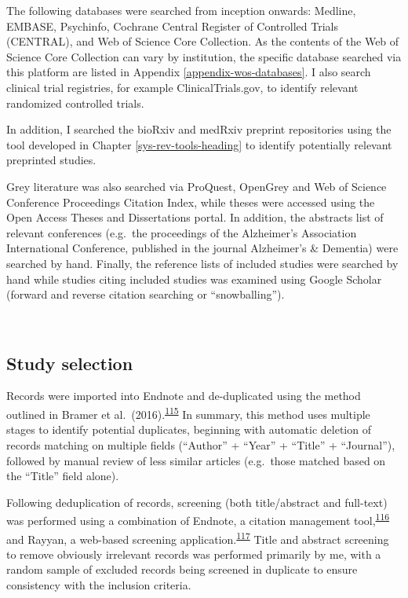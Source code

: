 \documentclass[a4paper, twoside]{templates/ociamthesis}
\begin{document}
The following databases were searched from inception onwards: Medline, EMBASE, Psychinfo, Cochrane Central Register of Controlled Trials (CENTRAL), and Web of Science Core Collection. As the contents of the Web of Science Core Collection can vary by institution, the specific database searched via this platform are listed in Appendix \ref{appendix-wos-databases}. I also search clinical trial registries, for example ClinicalTrials.gov, to identify relevant randomized controlled trials.

In addition, I searched the bioRxiv and medRxiv preprint repositories using the tool developed in Chapter \ref{sys-rev-tools-heading} to identify potentially relevant preprinted studies.

Grey literature was also searched via ProQuest, OpenGrey and Web of Science Conference Proceedings Citation Index, while theses were accessed using the Open Access Theses and Dissertations portal. In addition, the abstracts list of relevant conferences (e.g.~the proceedings of the Alzheimer's Association International Conference, published in the journal Alzheimer's \& Dementia) were searched by hand. Finally, the reference lists of included studies were searched by hand while studies citing included studies was examined using Google Scholar (forward and reverse citation searching or ``snowballing'').

~

\hypertarget{study-selection}{%
\subsection{Study selection}\label{study-selection}}

Records were imported into Endnote and de-duplicated using the method outlined in Bramer et al.~(2016).\textsuperscript{\protect\hyperlink{ref-bramer2016}{115}} In summary, this method uses multiple stages to identify potential duplicates, beginning with automatic deletion of records matching on multiple fields (``Author'' + ``Year'' + ``Title'' + ``Journal''), followed by manual review of less similar articles (e.g.~those matched based on the ``Title'' field alone).

Following deduplication of records, screening (both title/abstract and full-text) was performed using a combination of Endnote, a citation management tool,\textsuperscript{\protect\hyperlink{ref-hupe2019}{116}} and Rayyan, a web-based screening application.\textsuperscript{\protect\hyperlink{ref-ouzzani2016}{117}} Title and abstract screening to remove obviously irrelevant records was performed primarily by me, with a random sample of excluded records being screened in duplicate to ensure consistency with the inclusion criteria.
\end{document}
